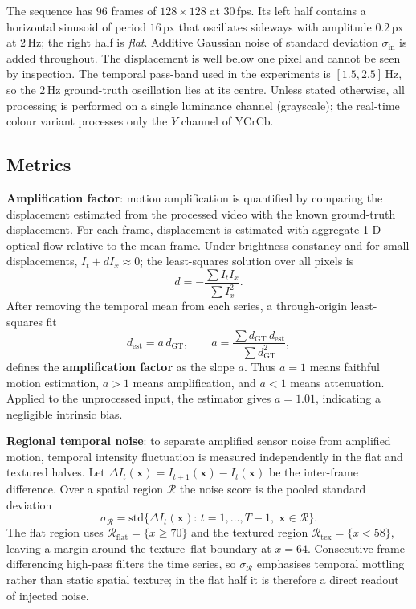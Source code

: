 \documentclass[conference]{IEEEtran}
\begin{document}
The sequence has $96$ frames of $128\times128$ at $30$\,fps. Its left half
contains a horizontal sinusoid of period $16$\,px that oscillates sideways
with amplitude $0.2$\,px at $2$\,Hz; the right half is \emph{flat}. Additive
Gaussian noise of standard deviation $\sigma_{\text{in}}$ is added
throughout. The displacement is well below one pixel and cannot be seen by
inspection. The temporal pass-band used in the experiments is
$[1.5,2.5]$\,Hz, so the $2$\,Hz ground-truth oscillation lies at its centre.
Unless stated otherwise, all processing is performed on a single luminance
channel (grayscale); the real-time colour variant processes only the $Y$
channel of YCrCb.

\subsection{Metrics}
\textbf{Amplification factor}: motion amplification is quantified by comparing
the displacement estimated from the processed video with the known
ground-truth displacement. For each frame, displacement is estimated with
aggregate 1-D optical flow relative to the mean frame. Under brightness
constancy and for small displacements, $I_t + d I_x \approx 0$; the
least-squares solution over all pixels is
\[
d = -\frac{\sum I_t I_x}{\sum I_x^2}.
\]
After removing the temporal mean from each series, a through-origin
least-squares fit
\[
d_{\mathrm{est}} = a\,d_{\mathrm{GT}},
\qquad
a = \frac{\sum d_{\mathrm{GT}}\,d_{\mathrm{est}}}
         {\sum d_{\mathrm{GT}}^2},
\]
defines the \textbf{amplification factor} as the slope $a$. Thus $a=1$ means
faithful motion estimation, $a>1$ means amplification, and $a<1$ means
attenuation. Applied to the unprocessed input, the estimator gives $a=1.01$,
indicating a negligible intrinsic bias.

\textbf{Regional temporal noise}: to separate amplified sensor noise from
amplified motion, temporal intensity fluctuation is measured independently in
the flat and textured halves. Let
$\Delta I_t(\mathbf{x}) = I_{t+1}(\mathbf{x}) - I_t(\mathbf{x})$ be the
inter-frame difference. Over a spatial region $\mathcal{R}$ the noise score
is the pooled standard deviation
\[
\sigma_{\mathcal{R}}
  = \mathrm{std}\bigl\{\Delta I_t(\mathbf{x})
      :\, t=1,\ldots,T{-}1,\; \mathbf{x}\in\mathcal{R}\bigr\}.
\]
The flat region uses $\mathcal{R}_{\mathrm{flat}}=\{x\geq 70\}$ and the
textured region $\mathcal{R}_{\mathrm{tex}}=\{x<58\}$, leaving a margin
around the texture--flat boundary at $x=64$. Consecutive-frame differencing
high-pass filters the time series, so $\sigma_{\mathcal{R}}$ emphasises
temporal mottling rather than static spatial texture; in the flat half it is
therefore a direct readout of injected noise.
\end{document}
